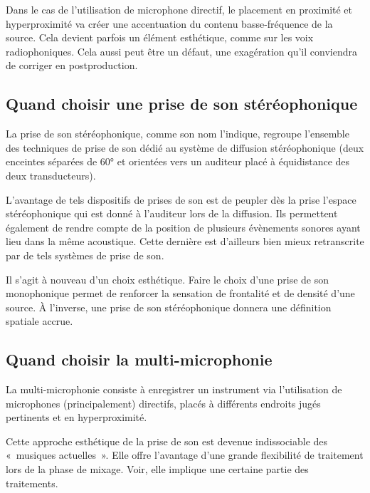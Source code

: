 \documentclass[
]{book}
\begin{document}
Dans le cas de l'utilisation de microphone directif, le placement en proximité et hyperproximité va créer une accentuation du contenu basse-fréquence de la source. Cela devient parfois un élément esthétique, comme sur les voix radiophoniques. Cela aussi peut être un défaut, une exagération qu'il conviendra de corriger en postproduction.

\hypertarget{quand-choisir-une-prise-de-son-stuxe9ruxe9ophonique}{%
\subsection{Quand choisir une prise de son stéréophonique}\label{quand-choisir-une-prise-de-son-stuxe9ruxe9ophonique}}

La prise de son stéréophonique, comme son nom l'indique, regroupe l'ensemble des techniques de prise de son dédié au système de diffusion stéréophonique (deux enceintes séparées de 60° et orientées vers un auditeur placé à équidistance des deux transducteurs).

L'avantage de tels dispositifs de prises de son est de peupler dès la prise l'espace stéréophonique qui est donné à l'auditeur lors de la diffusion. Ils permettent également de rendre compte de la position de plusieurs évènements sonores ayant lieu dans la même acoustique. Cette dernière est d'ailleurs bien mieux retranscrite par de tels systèmes de prise de son.

Il s'agit à nouveau d'un choix esthétique. Faire le choix d'une prise de son monophonique permet de renforcer la sensation de frontalité et de densité d'une source. À l'inverse, une prise de son stéréophonique donnera une définition spatiale accrue.

\hypertarget{quand-choisir-la-multi-microphonie}{%
\subsection{Quand choisir la multi-microphonie}\label{quand-choisir-la-multi-microphonie}}

La multi-microphonie consiste à enregistrer un instrument via l'utilisation de microphones (principalement) directifs, placés à différents endroits jugés pertinents et en hyperproximité.

Cette approche esthétique de la prise de son est devenue indissociable des «~musiques actuelles~». Elle offre l'avantage d'une grande flexibilité de traitement lors de la phase de mixage. Voir, elle implique une certaine partie des traitements.
\end{document}
